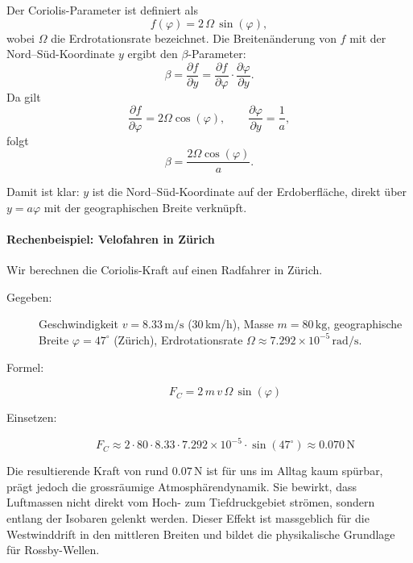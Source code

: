 Der Coriolis-Parameter ist definiert als
\begin{equation}
f(\varphi) = 2 \, \Omega \, \sin(\varphi),
\end{equation}
wobei \(\Omega\) die Erdrotationsrate bezeichnet. 
Die Breitenänderung von \(f\) mit der Nord–Süd-Koordinate \(y\) ergibt den \(\beta\)-Parameter:
\begin{equation}
\beta = \frac{\partial f}{\partial y} 
      = \frac{\partial f}{\partial \varphi} \cdot \frac{\partial \varphi}{\partial y}.
\end{equation}
Da gilt
\begin{equation}
\frac{\partial f}{\partial \varphi} = 2 \Omega \cos(\varphi), 
\qquad 
\frac{\partial \varphi}{\partial y} = \frac{1}{a},
\end{equation}
folgt
\begin{equation}
\beta = \frac{2 \Omega \cos(\varphi)}{a}.
\end{equation}

Damit ist klar: \(y\) ist die Nord–Süd-Koordinate auf der Erdoberfläche, 
direkt über \(y = a \varphi\) mit der geographischen Breite verknüpft.


\begin{beispiel}
\paragraph{Rechenbeispiel: Velofahren in Zürich}

Wir berechnen die Coriolis-Kraft auf einen Radfahrer in Zürich.

\begin{description}
	\item[Gegeben:] Geschwindigkeit \(v = 8.33\,\mathrm{m/s}\) (30\,km/h), Masse \(m =
	      80\,\mathrm{kg}\), geographische Breite \(\varphi = 47^\circ\) (Zürich),
	      Erdrotationsrate \(\Omega \approx 7.292 \times 10^{-5}\,\mathrm{rad/s}\).
	\item[Formel:]
	      \[
		      F_C = 2\,m\,v\,\Omega\,\sin(\varphi)
	      \]
	\item[Einsetzen:]
	      \[
		      F_C \approx 2 \cdot 80 \cdot 8.33 \cdot 7.292 \times 10^{-5} \cdot \sin(47^\circ)
		      \approx 0.070\,\mathrm{N}
	      \]
\end{description}

\end{beispiel}
\noindent
Die resultierende Kraft von rund \(0.07\,\mathrm{N}\) ist für uns im Alltag kaum spürbar, prägt jedoch die grossräumige Atmosphärendynamik.
Sie bewirkt, dass Luftmassen nicht direkt vom Hoch- zum Tiefdruckgebiet strömen, sondern entlang der Isobaren gelenkt werden.
Dieser Effekt ist massgeblich für die Westwinddrift in den mittleren Breiten und bildet die physikalische Grundlage für Rossby-Wellen.

